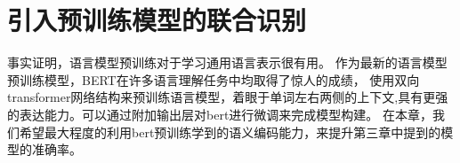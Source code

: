 \chapter{引入预训练模型的联合识别}

事实证明，语言模型预训练对于学习通用语言表示很有用。 作为最新的语言模型预训练模型，BERT在许多语言理解任务中均取得了惊人的成绩，
使用双向transformer网络结构来预训练语言模型，着眼于单词左右两侧的上下文,具有更强的表达能力。可以通过附加输出层对bert进行微调来完成模型构建。
在本章，我们希望最大程度的利用bert预训练学到的语义编码能力，来提升第三章中提到的模型的准确率。

